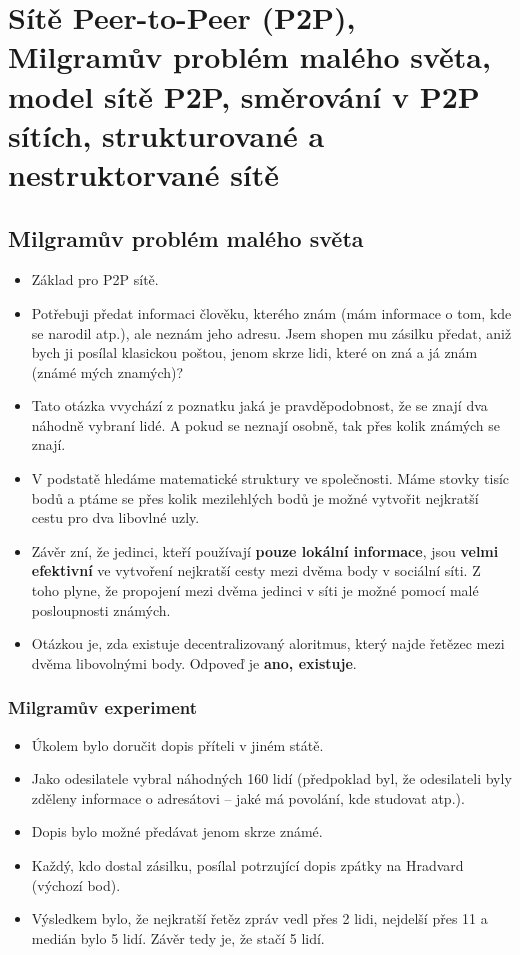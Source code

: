 \documentclass[11pt,a4paper]{article}
\begin{document}
 \sloppy
\titlepageandcontents

\section{Sítě Peer-to-Peer (P2P), Milgramův problém malého světa, model sítě P2P, směrování v P2P
sítích, strukturované a nestruktorvané sítě}
\subsection{Milgramův problém malého světa}
\begin{itemize}
\item Základ pro P2P sítě.
\item Potřebuji předat informaci člověku, kterého znám (mám informace o tom, kde se narodil atp.), ale neznám jeho adresu. Jsem shopen mu zásilku předat, aniž bych ji posílal klasickou poštou, jenom skrze lidi, které on zná a já znám (známé mých znamých)? 
\item Tato otázka vvychází z poznatku jaká je pravděpodobnost, že se znají dva náhodně vybraní lidé. A pokud se neznají osobně, tak přes kolik známých se znají.
\item V podstatě hledáme matematické struktury ve společnosti. Máme stovky tisíc bodů a ptáme se přes kolik mezilehlých bodů je možné vytvořit nejkratší cestu pro dva libovlné uzly.
\item Závěr zní, že jedinci, kteří používají \textbf{pouze lokální informace}, jsou \textbf{velmi efektivní} ve vytvoření nejkratší cesty mezi dvěma body v sociální síti. Z toho plyne, že propojení mezi dvěma jedinci v síti je možné pomocí malé posloupnosti známých.
\item Otázkou je, zda existuje decentralizovaný aloritmus, který najde řetězec mezi dvěma libovolnými body. Odpoveď je \textbf{ano, existuje}.
\end{itemize}
\subsubsection{Milgramův experiment}
\begin{itemize}
\item Úkolem bylo doručit dopis příteli v jiném státě.
\item Jako odesilatele vybral náhodných 160 lidí (předpoklad byl, že odesilateli byly zděleny informace o adresátovi -- jaké má povolání, kde studovat atp.).
\item Dopis bylo možné předávat jenom skrze známé.
\item Každý, kdo dostal zásilku, posílal potrzující dopis zpátky na Hradvard (výchozí bod).
\item Výsledkem bylo, že nejkratší řetěz zpráv vedl přes 2 lidi, nejdelší přes 11 a medián bylo 5 lidí. Závěr tedy je, že stačí 5 lidí.
\end{itemize}
\end{document}

